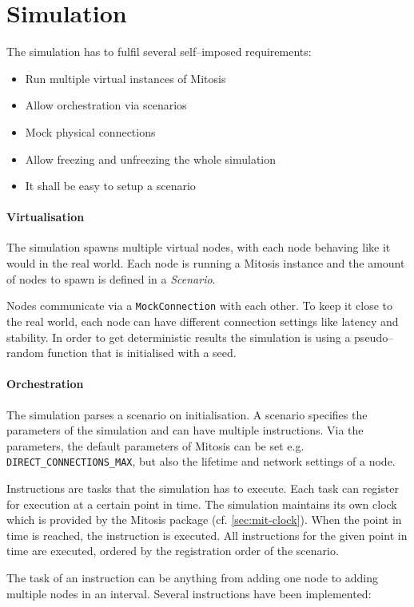 \section{Simulation}
The simulation has to fulfil several self–imposed requirements:
\begin{itemize}
    \item Run multiple virtual instances of Mitosis
    \item Allow orchestration via scenarios
    \item Mock physical connections
    \item Allow freezing and unfreezing the whole simulation
    \item It shall be easy to setup a scenario
\end{itemize}

\paragraph{Virtualisation}
The simulation spawns multiple virtual nodes, with each node behaving like it would in the real world. Each node is running a Mitosis instance and the amount of nodes to spawn is defined in a \textit{Scenario}. 

Nodes communicate via a \lstinline{MockConnection} with each other. To keep it close to the real world, each node can have different connection settings like latency and stability.
In order to get deterministic results the simulation is using a pseudo–random function that is initialised with a seed.

\paragraph{Orchestration}
The simulation parses a scenario on initialisation. A scenario specifies the parameters of the simulation and can have multiple instructions. Via the parameters, the default parameters of Mitosis can be set e.g. \lstinline{DIRECT_CONNECTIONS_MAX}, but also the lifetime and network settings of a node.

Instructions are tasks that the simulation has to execute. Each task can register for execution at a certain point in time.
The simulation maintains its own clock which is provided by the Mitosis package (cf. \vref{sec:mit-clock}).
When the point in time is reached, the instruction is executed. All instructions for the given point in time are executed, ordered by the registration order of the scenario.

The task of an instruction can be anything from adding one node to adding multiple nodes in an interval. Several instructions have been implemented:

